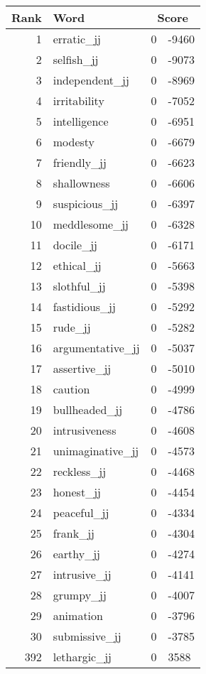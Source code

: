 \begin{longtable}[!htbp]{| rlr@{.}l |}
    \hline
    \textbf{Rank} & \textbf{Word} & \multicolumn{2}{c|}{\textbf{Score}} \\
    \hline
    \endhead
    1 & erratic\_jj & 0 & -9460 \\
    2 & selfish\_jj & 0 & -9073 \\
    3 & independent\_jj & 0 & -8969 \\
    4 & irritability & 0 & -7052 \\
    5 & intelligence & 0 & -6951 \\
    6 & modesty & 0 & -6679 \\
    7 & friendly\_jj & 0 & -6623 \\
    8 & shallowness & 0 & -6606 \\
    9 & suspicious\_jj & 0 & -6397 \\
    10 & meddlesome\_jj & 0 & -6328 \\
    11 & docile\_jj & 0 & -6171 \\
    12 & ethical\_jj & 0 & -5663 \\
    13 & slothful\_jj & 0 & -5398 \\
    14 & fastidious\_jj & 0 & -5292 \\
    15 & rude\_jj & 0 & -5282 \\
    16 & argumentative\_jj & 0 & -5037 \\
    17 & assertive\_jj & 0 & -5010 \\
    18 & caution & 0 & -4999 \\
    19 & bullheaded\_jj & 0 & -4786 \\
    20 & intrusiveness & 0 & -4608 \\
    21 & unimaginative\_jj & 0 & -4573 \\
    22 & reckless\_jj & 0 & -4468 \\
    23 & honest\_jj & 0 & -4454 \\
    24 & peaceful\_jj & 0 & -4334 \\
    25 & frank\_jj & 0 & -4304 \\
    26 & earthy\_jj & 0 & -4274 \\
    27 & intrusive\_jj & 0 & -4141 \\
    28 & grumpy\_jj & 0 & -4007 \\
    29 & animation & 0 & -3796 \\
    30 & submissive\_jj & 0 & -3785 \\
    392 & lethargic\_jj & 0 & 3588 \\

\end{longtable}
